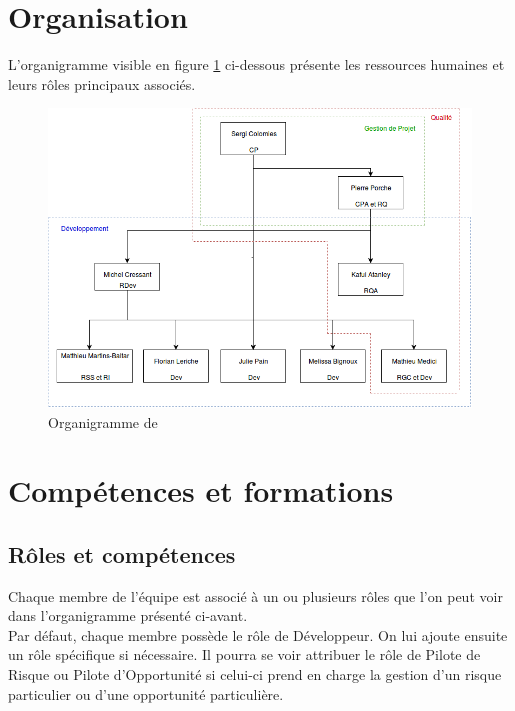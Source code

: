 
\section{Organisation} \label{Organisation}

L'organigramme visible en figure \ref{organigramme} ci-dessous présente les ressources humaines et leurs rôles principaux associés.

\begin{figure}[H]
   \centering
   \includegraphics[width=15cm]{images/organigramme.png}
   \caption{\label{organigramme} Organigramme de \nomEquipe}
\end{figure}

\section{Compétences et formations} \label{CompetencesEtFormations}
\subsection{Rôles et compétences} \label{RolesEtCompetences}

\indent Chaque membre de l'équipe \nomEquipe{} est associé à un ou plusieurs rôles que l’on peut voir dans l’organigramme présenté ci-avant.\\

\indent Par défaut, chaque membre possède le rôle de Développeur. On lui ajoute ensuite un rôle spécifique si nécessaire. Il pourra se voir attribuer le rôle de Pilote de Risque ou Pilote d'Opportunité si celui-ci prend en charge la gestion d’un risque particulier ou d'une opportunité particulière.\\ 

